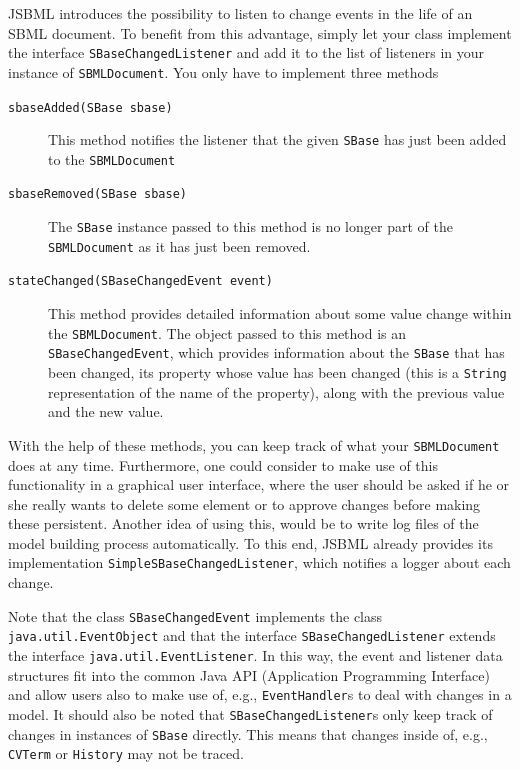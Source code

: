 \documentclass[
  BCOR12mm,
  letterpaper,
  11pt,
  headsepline,
  pointlessnumbers,
  tablecaptionabove,
  onelinecaption,
  headinclude,
  appendixprefix,
  idxtotoc,
  bibtotoc,
  twoside,
  titlepage
]{scrartcl}
\begin{document}
JSBML introduces the possibility to listen to change events in the life of an
SBML document. To benefit from this advantage, simply let your class implement
the interface \texttt{SBaseChangedListener} and add it to the list of listeners in
your instance of \texttt{SBMLDocument}. You only have to implement three methods
\begin{description}
 \item[\texttt{sbaseAdded(SBase sbase)}] This method notifies the listener that the given \texttt{SBase}
   has just been added to the \texttt{SBMLDocument}
 \item[\texttt{sbaseRemoved(SBase sbase)}] The \texttt{SBase} instance passed to this method is no
   longer part of the \texttt{SBMLDocument} as it has just been removed.
 \item[\texttt{stateChanged(SBaseChangedEvent event)}] This method provides detailed information about some value
   change within the \texttt{SBMLDocument}. The object passed to this method is
   an \texttt{SBaseChangedEvent}, which provides information about the \texttt{SBase}
   that has been changed, its property whose value has been changed (this is a
   \texttt{String} representation of the name of the property), along with the
   previous value and the new value.
\end{description}
With the help of these methods, you can keep track of what your
\texttt{SBMLDocument} does at any time. Furthermore, one could consider to make
use of this functionality in a graphical user interface, where the user should
be asked if he or she really wants to delete some element or to approve changes
before making these persistent. Another idea of using this, would be to write
log files of the model building process
automatically. To this end, JSBML already provides its implementation
\texttt{SimpleSBaseChangedListener},
 which notifies a logger about
each change.

Note that the class \texttt{SBaseChangedEvent} implements the class
\texttt{java.util.EventObject} and that the interface
\texttt{SBaseChangedListener} extends the interface
\texttt{java.util.EventListener}. In this way, the event and listener data
structures fit into the common Java\texttrademark{} API (Application Programming Interface) and
allow users also to make use of, e.g., \texttt{EventHandler}s to deal with
changes in a model. It should also be noted that \texttt{SBaseChangedListener}s
only keep track of changes in instances of \texttt{SBase} directly. This means
that changes inside of, e.g., \texttt{CVTerm} or \texttt{History} may not be
traced.
\end{document}
